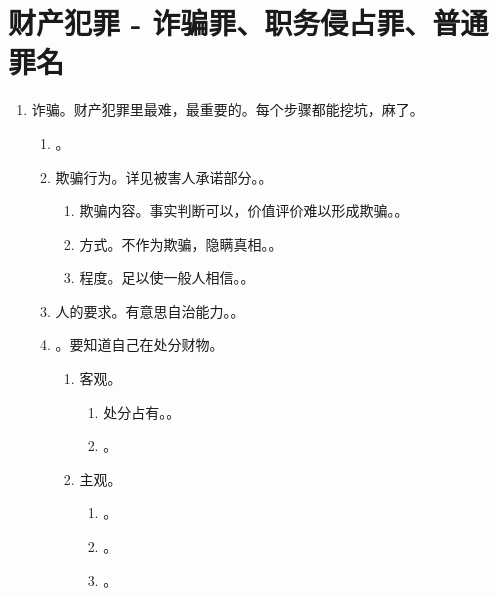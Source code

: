\section{财产犯罪 - 诈骗罪、职务侵占罪、普通罪名}
\begin{enumerate}
  \item 诈骗。财产犯罪里最难，最重要的。每个步骤都能挖坑，麻了。
        \begin{enumerate}
          \item {}。
          \item 欺骗行为。详见被害人承诺部分。。
                \begin{enumerate}
                  \item 欺骗内容。事实判断可以，价值评价难以形成欺骗。。
                  \item 方式。不作为欺骗，隐瞒真相。。
                  \item 程度。足以使一般人相信。。
                \end{enumerate}
          \item 人的要求。有意思自治能力。。
          \item {}。要知道自己在处分财物。
                \begin{enumerate}
                  \item 客观。
                        \begin{enumerate}
                          \item 处分占有。。
                          \item {}。
                        \end{enumerate}
                  \item 主观。
                        \begin{enumerate}
                          \item {}。
                          \item {}。
                          \item {}。

\end{enumerate}
\end{enumerate}
\end{enumerate}
\end{enumerate}
